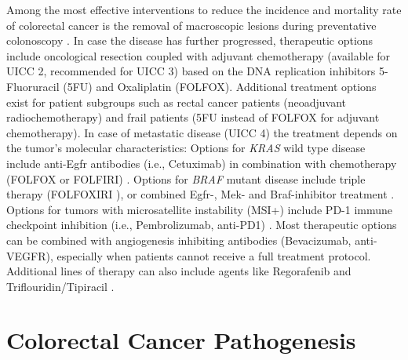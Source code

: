 \begin{flushleft}
Among the most effective interventions to reduce the incidence and mortality rate of colorectal cancer is the removal of macroscopic lesions during preventative colonoscopy \parencite{nishiharaLongtermColorectalcancerIncidence2013}. In case the disease has further progressed, therapeutic options include oncological resection coupled with adjuvant chemotherapy (available for UICC 2, recommended for UICC 3) based on the DNA replication inhibitors 5-Fluoruracil (5FU) and Oxaliplatin (FOLFOX). Additional treatment options exist for patient subgroups such as rectal cancer patients (neoadjuvant radiochemotherapy) and frail patients (5FU instead of FOLFOX for adjuvant chemotherapy). In case of metastatic disease (UICC 4) the treatment depends on the tumor's molecular characteristics: Options for \textit{KRAS} wild type disease include anti-Egfr antibodies (i.e., Cetuximab) in combination with chemotherapy (FOLFOX or FOLFIRI) \parencite{vancutsemESMOConsensusGuidelines2016a}. Options for \textit{BRAF} mutant disease include triple therapy (FOLFOXIRI \parencite{vancutsemESMOConsensusGuidelines2016a}), or combined Egfr-, Mek- and Braf-inhibitor treatment \parencite{kopetzEncorafenibBinimetinibCetuximab2019}. Options for tumors with microsatellite instability (MSI+) include PD-1 immune checkpoint inhibition (i.e., Pembrolizumab, anti-PD1) \parencite{andrePembrolizumabMicrosatelliteInstabilityHighAdvanced2020}. Most therapeutic options can be combined with angiogenesis inhibiting antibodies (Bevacizumab, anti-VEGFR), especially when patients cannot receive a full treatment protocol. Additional lines of therapy can also include agents like Regorafenib and Triflouridin/Tipiracil \parencite{vancutsemESMOConsensusGuidelines2016a}. 
\par

\section{Colorectal Cancer Pathogenesis}


\end{flushleft}
